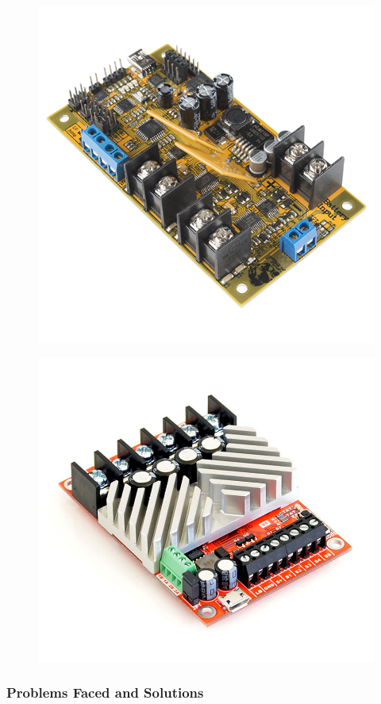 \begin{figure}[H]
    \centering
    \begin{minipage}{.5\textwidth}
        \centering
        \includegraphics[width=\linewidth]{figures/trex.jpg}
        \label{fig:test1}
    \end{minipage}%
    \begin{minipage}{.5\textwidth}
        \centering
        \includegraphics[width=\linewidth]{figures/roboclaw.jpg}
        \label{fig:test1}
    \end{minipage}
\end{figure}



\subsubsection*{Problems Faced and Solutions}